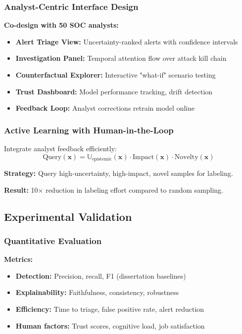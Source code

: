 \documentclass[11pt,letterpaper]{article}
\begin{document}
\subsubsection{Analyst-Centric Interface Design}

\textbf{Co-design with 50 SOC analysts:}

\begin{itemize}
\item \textbf{Alert Triage View:} Uncertainty-ranked alerts with confidence intervals
\item \textbf{Investigation Panel:} Temporal attention flow over attack kill chain
\item \textbf{Counterfactual Explorer:} Interactive "what-if" scenario testing
\item \textbf{Trust Dashboard:} Model performance tracking, drift detection
\item \textbf{Feedback Loop:} Analyst corrections retrain model online
\end{itemize}

\subsubsection{Active Learning with Human-in-the-Loop}

Integrate analyst feedback efficiently:
\begin{equation}
\text{Query}(\mathbf{x}) = \mathbb{U}_{\text{epistemic}}(\mathbf{x}) \cdot \text{Impact}(\mathbf{x}) \cdot \text{Novelty}(\mathbf{x})
\end{equation}

\textbf{Strategy:} Query high-uncertainty, high-impact, novel samples for labeling.

\textbf{Result:} 10× reduction in labeling effort compared to random sampling.

\subsection{Experimental Validation}

\subsubsection{Quantitative Evaluation}

\textbf{Metrics:}
\begin{itemize}
\item \textbf{Detection:} Precision, recall, F1 (dissertation baselines)
\item \textbf{Explainability:} Faithfulness, consistency, robustness
\item \textbf{Efficiency:} Time to triage, false positive rate, alert reduction
\item \textbf{Human factors:} Trust scores, cognitive load, job satisfaction
\end{itemize}
\end{document}
